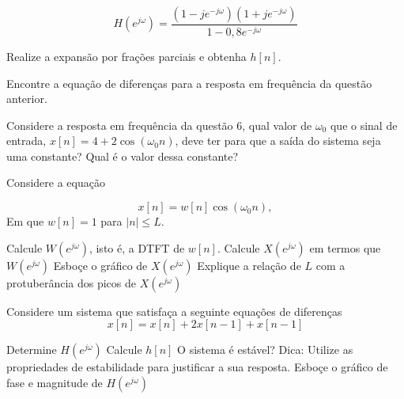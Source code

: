 \documentclass[12pt,a4paper]{article}
\begin{document}
\begin{equation}
H\left( e^{j\omega} \right) = \frac{\left( 1 - j e^{-j\omega} \right) \left( 1 + j e^{-j\omega} \right)}{1 - 0,8 e^{-j\omega}}
\end{equation}

Realize a expansão por frações parciais e obtenha \(h [n]\).

\problem Encontre a equação de diferenças para a resposta em frequência da questão anterior.

\problem Considere a resposta em frequência da questão 6, qual valor de \(\omega_0\) que o sinal de entrada, \(x [n] = 4 + 2 \cos{(\omega_0 n)}\), deve ter para que a saída do sistema seja uma constante? Qual é o valor dessa constante?

\problem Considere a equação

\begin{equation}
    x[n] = w[n] \cos{(\omega_0 n)},
\end{equation}
Em que \(w [n] = 1\) para \(|n| \leq L\).

\subproblem Calcule \(W\left( e^{j\omega} \right)\),  isto é, a DTFT de \(w [n]\).
\subproblem Calcule \(X\left( e^{j\omega} \right)\) em termos que \(W\left( e^{j\omega} \right)\)
\subproblem Esboçe o gráfico de \(X\left( e^{j\omega} \right)\)
\subproblem Explique a relação de \(L\) com a protuberância dos picos de \(X\left( e^{j\omega} \right)\)

\problem Considere um sistema que satisfaça a seguinte equações de diferenças
\begin{equation}
    x[n] = x[n] + 2x\left[ n-1 \right] + x\left[ n-1 \right]
\end{equation}

\subproblem Determine \(H\left( e^{j\omega} \right)\)
\subproblem Calcule \(h[n]\)
\subproblem O sistema é estável? Dica: Utilize as propriedades de estabilidade para justificar a sua resposta.
\subproblem Esboçe o gráfico de fase e magnitude de \(H\left( e^{j\omega} \right)\)
\end{document}

